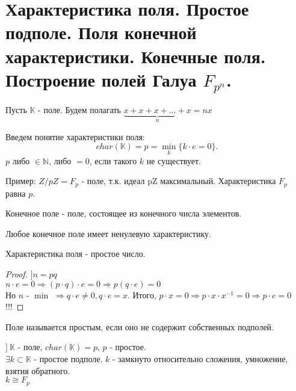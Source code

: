\section{Характеристика поля. Простое подполе. Поля конечной характеристики. Конечные поля.
Построение полей Галуа $F_{p^n}$.}

Пусть $\mathbb{K}$ - поле.
Будем полагать $\underbrace{x + x + x + \dots + x}_{n} = nx$

Введем понятие характеристики поля:
\[char(\mathbb{K}) = p = \underset{k}{\min}\{k \cdot e = 0\}.\]
$p$ либо $\in \mathbb{N}$, либо $= 0$, если такого $k$ не существует.

Пример: $Z/pZ = F_p$ - поле, т.к. идеал pZ максимальный. Характеристика $F_p$ равна $p$.

\begin{defn}
Конечное поле - поле, состоящее из конечного числа элементов.
\end{defn}

\begin{thm}[Свойство]
Любое конечное поле имеет ненулевую характеристику.
\end{thm}

\begin{thm}[Свойство]
Характеристика поля - простое число.
\end{thm}
\begin{proof}
$] n = pq$ \\
$n \cdot e = 0 \Rightarrow (p \cdot q) \cdot e = 0 \Rightarrow p(q \cdot e) = 0$ \\
Но $n$ - $\min$ $\Rightarrow q \cdot e \neq 0, q \cdot e = x$.
Итого, $p \cdot x = 0 \Rightarrow p \cdot x \cdot x^{-1} = 0 \Rightarrow p \cdot e = 0$!!!
\end{proof}

\begin{defn}
Поле называется простым, если оно не содержит собственных подполей.
\end{defn}

$]~\mathbb{K}$ - поле, $char(\mathbb{K}) = p$, $p$ - простое.\\
$\exists k \subset \mathbb{K}$ - простое подполе. $k$ - замкнуто относительно сложения, умножение, взятия обратного.\\
$k \cong F_p$\\

